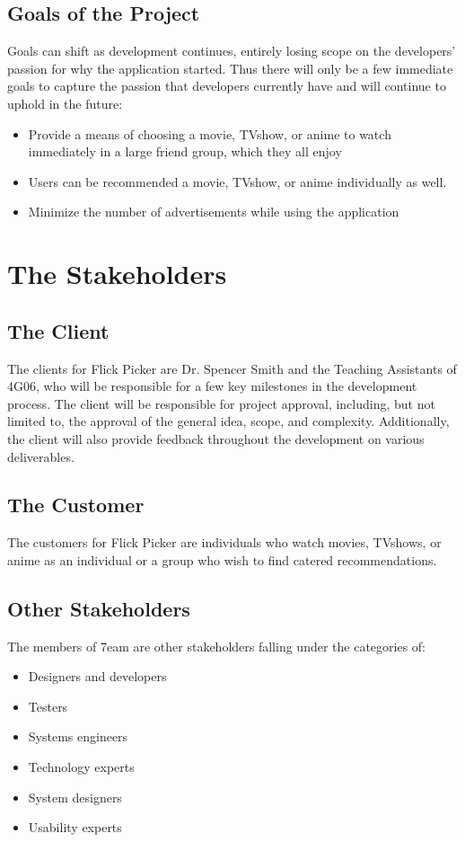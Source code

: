 \documentclass[12pt]{article}
\begin{document}
\subsection{Goals of the Project}
Goals can shift as development continues, entirely losing scope on the developers' passion for why the application started. Thus there will only be a few immediate goals to capture the passion that developers currently have and will continue to uphold in the future:
\begin{itemize}
	\item Provide a means of choosing a movie, TVshow, or anime to watch immediately in a large friend group, which they all enjoy
	\item Users can be recommended a movie, TVshow, or anime individually as well.
	\item Minimize the number of advertisements while using the application
\end{itemize}

\section{The Stakeholders}
\subsection{The Client}
The clients for Flick Picker are Dr. Spencer Smith and the Teaching Assistants of 4G06, who will be responsible for a few key milestones in the development process.
The client will be responsible for project approval, including, but not limited to, the approval of the general idea, scope, and complexity.
Additionally, the client will also provide feedback throughout the development on various deliverables.

\subsection{The Customer}
The customers for Flick Picker are individuals who watch movies, TVshows, or anime as an individual or a group who wish to find catered recommendations.

\subsection{Other Stakeholders}

The members of 7eam are other stakeholders falling under the categories of:
\begin{itemize}
    \item Designers and developers
    \item Testers
    \item Systems engineers
    \item Technology experts
    \item System designers
    \item Usability experts
\end{itemize}
\end{document}
